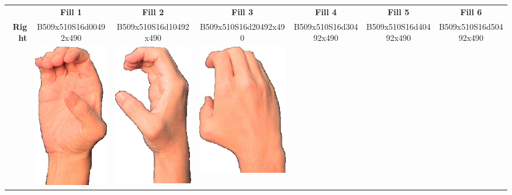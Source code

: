\documentclass{article}
\begin{document}
\begin{center}
\begin{tabular}{r*{6}{c}}
&\textbf{Fill 1}&\textbf{Fill 2}&\textbf{Fill 3}&\textbf{Fill 4}&\textbf{Fill 5}&\textbf{Fill 6}\\
\multirow{2}{*}{\textbf{Right}}&
B509x510S16d00492x490&
B509x510S16d10492x490&
B509x510S16d20492x490&
B509x510S16d30492x490&
B509x510S16d40492x490&
B509x510S16d50492x490\\
&
\includegraphics[scale=0.1]{images/05-14-1.jpg}&
\includegraphics[scale=0.1]{images/05-14-2.jpg}&
\includegraphics[scale=0.1]{images/05-14-3.jpg}&

\end{tabular}
\end{center}
\end{document}
